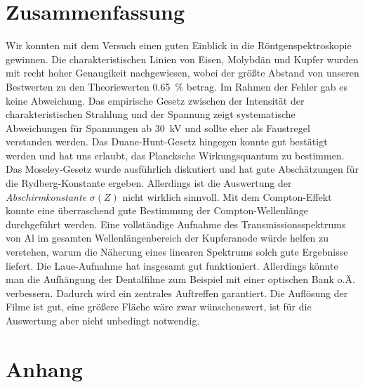 \documentclass[paper=a4,
	fontsize=10pt,
	DIV=18,
	twocolumn,
	parskip=half
	]{scrartcl}
\numberwithin{equation}{section}    %
\begin{document}
\section{Zusammenfassung}
%
Wir konnten mit dem Versuch einen guten Einblick in die Röntgenspektroskopie
gewinnen. Die charakteristischen Linien von Eisen, Molybdän und Kupfer wurden mit
recht hoher Genaugikeit nachgewiesen, wobei der größte Abstand von unseren
Bestwerten zu den Theoriewerten 
\SI{0.65}{\percent} betrag. Im Rahmen der Fehler gab es keine Abweichung. 
 Das empirische Gesetz zwischen der Intensität der
charakteristischen Strahlung und der Spannung zeigt systematische Abweichungen
für Spannungen ab \SI{30}{\kilo\volt} und sollte eher als Faustregel verstanden
werden. Das Duane-Hunt-Gesetz hingegen konnte gut bestätigt werden und hat uns
erlaubt, das Plancksche Wirkungsquantum zu bestimmen. Das Moseley-Gesetz wurde
ausführlich diskutiert und hat gute Abschätzungen für die Rydberg-Konstante
ergeben. Allerdings ist die Auswertung der \emph{Abschirmkonstante} $\sigma(Z)$
nicht wirklich sinnvoll. Mit dem Compton-Effekt konnte eine überraschend gute
Bestimmung der Compton-Wellenlänge durchgeführt werden. Eine vollständige
Aufnahme des Transmissionsspektrums von Al im gesamten Wellenlängenbereich der
Kupferanode würde helfen zu verstehen, warum die Näherung eines linearen
Spektrums solch gute Ergebnisse liefert. Die Laue-Aufnahme hat insgesamt gut
funktioniert. Allerdings könnte man die Aufhängung der Dentalfilme zum Beispiel
mit einer optischen Bank o.Ä. verbessern. Dadurch wird ein zentrales 
Auftreffen garantiert. Die Auflösung 
der Filme ist gut, eine größere Fläche wäre zwar wünschenswert, ist für die
Auswertung aber nicht unbedingt notwendig. 
%
%
%
%

\small

\nocite{*}

\normalsize


\onecolumn
\pagestyle{empty}
% 

\section{Anhang}
\label{Anhang}
\end{document}
